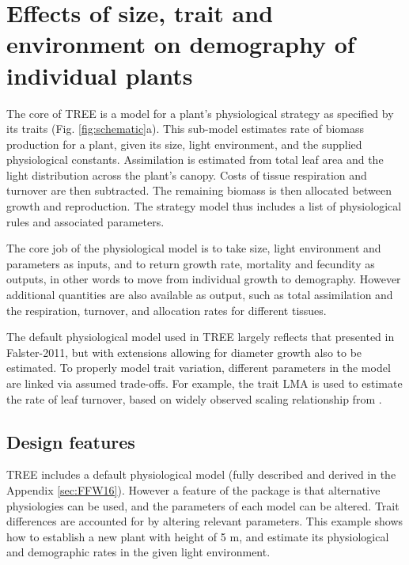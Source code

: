 \documentclass[]{article}
\begin{document}
\section{Effects of size, trait and environment on demography of
individual
plants}\label{effects-of-size-trait-and-environment-on-demography-of-individual-plants}

The core of TREE is a model for a plant's physiological strategy as
specified by its traits (Fig. \ref{fig:schematic}a). This sub-model
estimates rate of biomass production for a plant, given its size, light
environment, and the supplied physiological constants. Assimilation is
estimated from total leaf area and the light distribution across the
plant's canopy. Costs of tissue respiration and turnover are then
subtracted. The remaining biomass is then allocated between growth and
reproduction. The strategy model thus includes a list of physiological
rules and associated parameters.

The core job of the physiological model is to take size, light
environment and parameters as inputs, and to return growth rate,
mortality and fecundity as outputs, in other words to move from
individual growth to demography. However additional quantities are also
available as output, such as total assimilation and the respiration,
turnover, and allocation rates for different tissues.

The default physiological model used in TREE largely reflects that
presented in Falster-2011, but with extensions allowing for diameter
growth also to be estimated. To properly model trait variation,
different parameters in the model are linked via assumed trade-offs. For
example, the trait LMA is used to estimate the rate of leaf turnover,
based on widely observed scaling relationship from \citet{Wright-2004}.

\subsection{Design features}\label{design-features}

TREE includes a default physiological model (fully described and derived
in the Appendix \ref{sec:FFW16}). However a feature of the package is that alternative
physiologies can be used, and the parameters of each model can be
altered. Trait differences are accounted for by altering relevant
parameters. This example shows how to establish a new plant with height
of 5 m, and estimate its physiological and demographic rates in the
given light environment.
\end{document}
